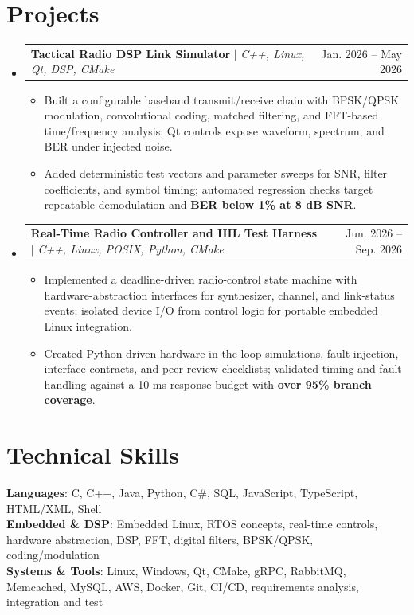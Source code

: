 \documentclass[letterpaper,11pt]{article}
\makeatletter
\newcommand{\resumeItem}[1]{
  \item\small{
    {#1 \vspace{-2pt}}
  }
}
\newcommand{\resumeProjectHeading}[2]{
    \item
    \begin{tabular*}{0.97\textwidth}{l@{\extracolsep{\fill}}r}
      \small#1 & #2 \\
    \end{tabular*}\vspace{-7pt}
}
\newcommand{\resumeSubHeadingListStart}{\begin{itemize}[leftmargin=0.15in, label={}]}
\newcommand{\resumeSubHeadingListEnd}{\end{itemize}}
\newcommand{\resumeItemListStart}{\begin{itemize}}
\newcommand{\resumeItemListEnd}{\end{itemize}\vspace{-5pt}}
\makeatother
\begin{document}
\section{Projects}
\resumeSubHeadingListStart
\resumeProjectHeading
{\textbf{Tactical Radio DSP Link Simulator} $|$ \emph{C++, Linux, Qt, DSP, CMake}}{Jan. 2026 -- May 2026}
\resumeItemListStart
\resumeItem{Built a configurable baseband transmit/receive chain with BPSK/QPSK modulation, convolutional coding, matched filtering, and FFT-based time/frequency analysis; Qt controls expose waveform, spectrum, and BER under injected noise.}
\resumeItem{Added deterministic test vectors and parameter sweeps for SNR, filter coefficients, and symbol timing; automated regression checks target repeatable demodulation and \textbf{BER below 1\% at 8 dB SNR}.}
\resumeItemListEnd
\resumeProjectHeading
{\textbf{Real-Time Radio Controller and HIL Test Harness} $|$ \emph{C++, Linux, POSIX, Python, CMake}}{Jun. 2026 -- Sep. 2026}
\resumeItemListStart
\resumeItem{Implemented a deadline-driven radio-control state machine with hardware-abstraction interfaces for synthesizer, channel, and link-status events; isolated device I/O from control logic for portable embedded Linux integration.}
\resumeItem{Created Python-driven hardware-in-the-loop simulations, fault injection, interface contracts, and peer-review checklists; validated timing and fault handling against a 10 ms response budget with \textbf{over 95\% branch coverage}.}
\resumeItemListEnd
\resumeSubHeadingListEnd

\section{Technical Skills}
\begin{itemize}[leftmargin=0.15in, label={}]
  \small{\item{
        \textbf{Languages}{: C, C++, Java, Python, C\#, SQL, JavaScript, TypeScript, HTML/XML, Shell} \\
        \textbf{Embedded \& DSP}{: Embedded Linux, RTOS concepts, real-time controls, hardware abstraction, DSP, FFT, digital filters, BPSK/QPSK, coding/modulation} \\
        \textbf{Systems \& Tools}{: Linux, Windows, Qt, CMake, gRPC, RabbitMQ, Memcached, MySQL, AWS, Docker, Git, CI/CD, requirements analysis, integration and test}
        }}
\end{itemize}
\end{document}
